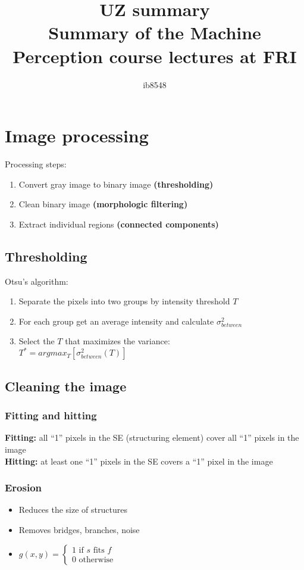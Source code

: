 \documentclass{article}
\author{ib8548}
\title{
    UZ summary \\
    \large Summary of the Machine Perception course lectures at FRI
}
\begin{document}
\maketitle
\newpage
\tableofcontents
\newpage

\section{Image processing}

Processing steps:
\begin{enumerate}
    \item Convert gray image to binary image \textbf{(thresholding)}
    \item Clean binary image \textbf{(morphologic filtering)}
    \item Extract individual regions \textbf{(connected components)}
\end{enumerate}

    \subsection{Thresholding}
    Otsu's algorithm:
    \begin{enumerate}
        \item Separate the pixels into two groups by intensity threshold $T$
        \item For each group get an average intensity and calculate $\sigma^{2}_{between}$
        \item Select the $T$ that maximizes the variance: \\
                  $T^* = argmax_T[ \sigma^{2}_{between}(T) ]$
    \end{enumerate}

    \subsection{Cleaning the image}
    
        \subsubsection{Fitting and hitting}
        \textbf{Fitting:} all ``1'' pixels in the SE (structuring element) cover all ``1'' pixels in the image \\ 
        \textbf{Hitting:} at least one ``1'' pixels in the SE covers a ``1'' pixel in the image

        \subsubsection{Erosion}
        \begin{itemize}
            \item Reduces the size of structures
            \item Removes bridges, branches, noise
            \item $g(x, y) = 
            \begin{cases}
                1 \text{ if } s \text{ fits } f \\
                0 \text{ otherwise }
            \end{cases}$
        \end{itemize}
\end{document}
